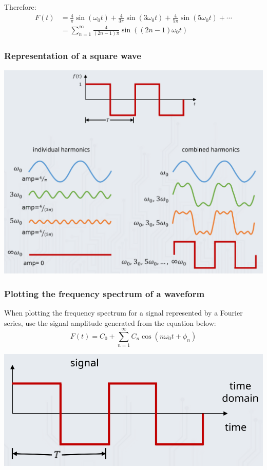 \documentclass[11pt]{article}
\begin{document}
Therefore:
\begin{align*}
F(t) &= \frac{4}{\pi} \sin(\omega_0 t) + \frac{4}{3 \pi} \sin(3 \omega_0 t) + \frac{4}{5 \pi} \sin (5 \omega_0 t) + \cdots \\
&= \sum_{n = 1}^{\infty} \frac{4}{(2n - 1) \pi} \sin ((2n - 1) \omega_0 t)
\end{align*}
\subsubsection{Representation of a square wave}
\label{sec:org912bd5b}
\begin{center}
\includegraphics[width=.9\linewidth]{./images/square-wave-fourier-series-representation.png}
\end{center}

 \newpage
\subsubsection{Plotting the frequency spectrum of a waveform}
\label{sec:org979f2b3}
When plotting the frequency spectrum for a signal represented by a Fourier series, use the signal amplitude generated from the equation below:
\[F(t) = C_0 + \sum_{n = 1}^{\infty} C_n \cos (n \omega_0 t + \phi_n)\]

\begin{center}
\includegraphics[width=.9\linewidth]{./images/square-wave-signal.png}
\end{center}
\end{document}
